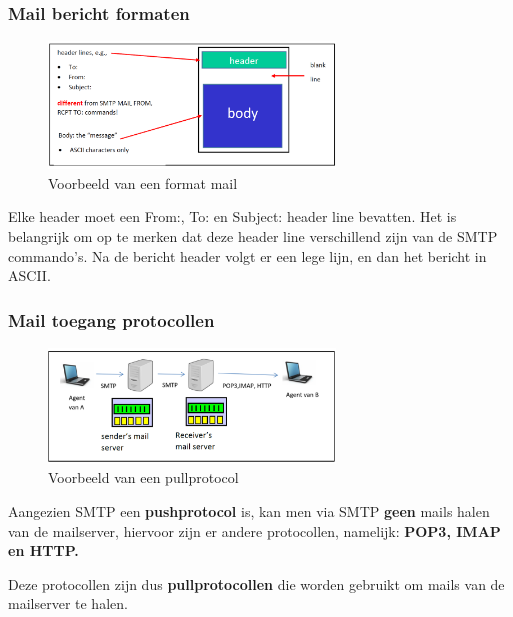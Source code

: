 \clearpage

\subsubsection{Mail bericht formaten}

\begin{figure}[h]
\centering
\includegraphics[width=3in]{./img/imghfdst2/formatmail.PNG}
\caption{Voorbeeld van een format mail }
\label{fig:format mail}
\end{figure}

\noindent Elke header moet een From:, To: en Subject: header line bevatten. Het is belangrijk om op te merken dat deze header line verschillend zijn van de SMTP commando’s. Na de bericht header volgt er een lege lijn, en dan het bericht in ASCII.

\subsubsection{Mail toegang protocollen}

\begin{figure}[h]
\centering
\includegraphics[width=3in]{./img/imghfdst2/access.PNG}
\caption{Voorbeeld van een pullprotocol }
\label{fig:pullprotocol}
\end{figure}

\noindent Aangezien SMTP een \textbf{pushprotocol} is, kan men via SMTP \textbf{geen} mails halen van de mailserver, hiervoor zijn er andere protocollen, namelijk: \textbf{POP3, IMAP en HTTP.}

\noindent Deze protocollen zijn dus \textbf{pullprotocollen} die worden gebruikt om mails van de mailserver te halen.



